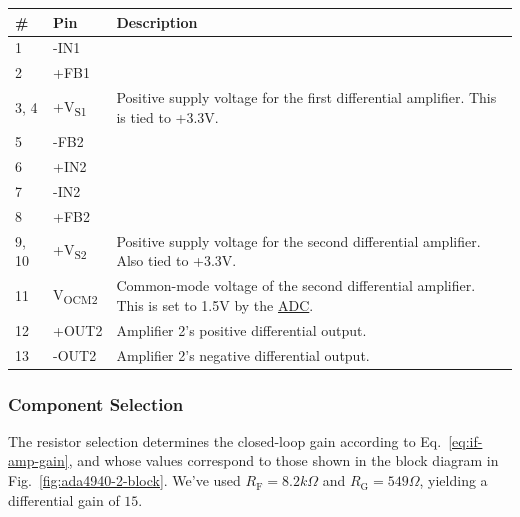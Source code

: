 \label{tab:ada4940-2-pinout}
\begin{tabularx}{\textwidth}{l l X}
        \caption{The ADA4940-2 ADC pinout.}                                         \\
        \toprule
        \#    & Pin                   & Description                                 \\
        \midrule
        1     & -IN1                  &                                             \\
        2     & +FB1                  &                                             \\
        3, 4  & +V\textsubscript{S1}  & Positive supply voltage for the first differential amplifier. This is tied to
        +3.3V.                                                                      \\
        5     & -FB2                  &                                             \\
        6     & +IN2                  &                                             \\
        7     & -IN2                  &                                             \\
        8     & +FB2                  &                                             \\
        9, 10 & +V\textsubscript{S2}  & Positive supply voltage for the second differential amplifier. Also tied to
        +3.3V.                                                                      \\
        11    & V\textsubscript{OCM2} & Common-mode voltage of the second differential
        amplifier. This is set to 1.5V by the \hyperref[sec:ltc2292]{ADC}.          \\
        12    & +OUT2                 & Amplifier 2's positive differential output. \\
        13    & -OUT2                 & Amplifier 2's negative differential output. \\
        \bottomrule
\end{tabularx}

\subsubsection{Component Selection}
\label{sec:ada4940-2-component-selection}

The resistor selection determines the closed-loop gain according to Eq.~\ref{eq:if-amp-gain}, and
whose values correspond to those shown in the block diagram in Fig.~\ref{fig:ada4940-2-block}. We've
used $R_{\text{F}} = 8.2 \si{k\Omega}$ and $R_{\text{G}} = 549 \si{\Omega}$, yielding a differential
gain of $15$.

